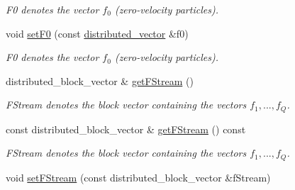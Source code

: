 \begin{DoxyCompactItemize}
\begin{DoxyCompactList}\small\item\em F0 denotes the vector $ f_0 $ (zero-\/velocity particles). \item\end{DoxyCompactList}\item 
\hypertarget{classnatrium_1_1DistributionFunctions_ae7cc68f9576384b3fbec8f171856f607}{
void \hyperlink{classnatrium_1_1DistributionFunctions_ae7cc68f9576384b3fbec8f171856f607}{setF0} (const \hyperlink{namespacenatrium_a903d2b92917f582f2ff05f52160ab811}{distributed\_\-vector} \&f0)}
\label{classnatrium_1_1DistributionFunctions_ae7cc68f9576384b3fbec8f171856f607}

\begin{DoxyCompactList}\small\item\em F0 denotes the vector $ f_0 $ (zero-\/velocity particles). \item\end{DoxyCompactList}\item 
\hypertarget{classnatrium_1_1DistributionFunctions_a74dfe8e6ac6d5f463dcb8220f37800a3}{
distributed\_\-block\_\-vector \& \hyperlink{classnatrium_1_1DistributionFunctions_a74dfe8e6ac6d5f463dcb8220f37800a3}{getFStream} ()}
\label{classnatrium_1_1DistributionFunctions_a74dfe8e6ac6d5f463dcb8220f37800a3}

\begin{DoxyCompactList}\small\item\em FStream denotes the block vector containing the vectors $ f_1, ..., f_Q $. \item\end{DoxyCompactList}\item 
\hypertarget{classnatrium_1_1DistributionFunctions_a88224d528262c522ea2ad8bec11178c1}{
const distributed\_\-block\_\-vector \& \hyperlink{classnatrium_1_1DistributionFunctions_a88224d528262c522ea2ad8bec11178c1}{getFStream} () const }
\label{classnatrium_1_1DistributionFunctions_a88224d528262c522ea2ad8bec11178c1}

\begin{DoxyCompactList}\small\item\em FStream denotes the block vector containing the vectors $ f_1, ..., f_Q $. \item\end{DoxyCompactList}\item 
\hypertarget{classnatrium_1_1DistributionFunctions_ad0ada0c54968a61f78eb1b82eb6c5a68}{
void \hyperlink{classnatrium_1_1DistributionFunctions_ad0ada0c54968a61f78eb1b82eb6c5a68}{setFStream} (const distributed\_\-block\_\-vector \&fStream)}
\label{classnatrium_1_1DistributionFunctions_ad0ada0c54968a61f78eb1b82eb6c5a68}


\end{DoxyCompactItemize}

